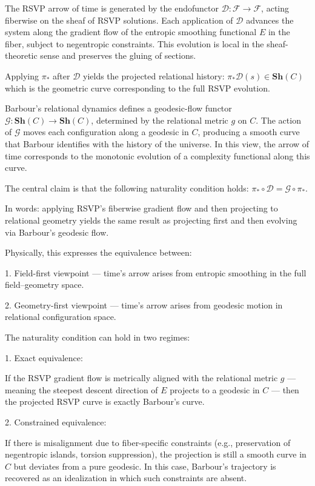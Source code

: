 \documentclass[11pt]{article}
\theoremstyle{plain}
\theoremstyle{definition}
\begin{document}
The RSVP arrow of time is generated by the endofunctor
$\mathcal{D}: \mathscr{F} \to \mathscr{F}$,
acting fiberwise on the sheaf of RSVP solutions. Each application of $\mathcal{D}$ advances the system along the gradient flow of the entropic smoothing functional $E$ in the fiber, subject to negentropic constraints. This evolution is local in the sheaf-theoretic sense and preserves the gluing of sections.

Applying $\pi_*$ after $\mathcal{D}$ yields the projected relational history:
$\pi_* \mathcal{D} (s) \in \mathbf{Sh}(C)$
which is the geometric curve corresponding to the full RSVP evolution.

Barbour’s relational dynamics defines a geodesic-flow functor
$\mathcal{G} : \mathbf{Sh}(C) \to \mathbf{Sh}(C)$,
determined by the relational metric $g$ on $C$. The action of $\mathcal{G}$ moves each configuration along a geodesic in $C$, producing a smooth curve that Barbour identifies with the history of the universe. In this view, the arrow of time corresponds to the monotonic evolution of a complexity functional along this curve.

The central claim is that the following naturality condition holds:
$\pi_* \circ \mathcal{D} = \mathcal{G} \circ \pi_*$.

In words: applying RSVP’s fiberwise gradient flow and then projecting to relational geometry yields the same result as projecting first and then evolving via Barbour’s geodesic flow.

Physically, this expresses the equivalence between:

1. Field-first viewpoint — time’s arrow arises from entropic smoothing in the full field–geometry space.

2. Geometry-first viewpoint — time’s arrow arises from geodesic motion in relational configuration space.

The naturality condition can hold in two regimes:

1. Exact equivalence:

   If the RSVP gradient flow is metrically aligned with the relational metric $g$ — meaning the steepest descent direction of $E$ projects to a geodesic in $C$ — then the projected RSVP curve is exactly Barbour’s curve.

2. Constrained equivalence:

   If there is misalignment due to fiber-specific constraints (e.g., preservation of negentropic islands, torsion suppression), the projection is still a smooth curve in $C$ but deviates from a pure geodesic. In this case, Barbour’s trajectory is recovered as an idealization in which such constraints are absent.
\end{document}
